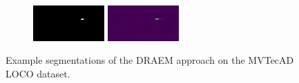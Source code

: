 \begin{figure}[H]
\begin{subfigure}[b]{\textwidth}
\begin{minipage}{0.45\textwidth}
            \includegraphics[width=0.3\textwidth]{figures/appendix/appendix_DRAEM/SC/237m.png}
            \includegraphics[width=0.3\textwidth]{figures/appendix/appendix_DRAEM/SC/237_mask.png}
        \end{minipage}
    \end{subfigure}


    \caption{Example segmentations of the DRAEM \cite{Zavrtanik_2021DRAEM} approach on the MVTecAD LOCO \cite{LOCODentsAndScratchesBergmann2022} dataset.}
    \label{fig:appendixDRAEM}
\end{figure}